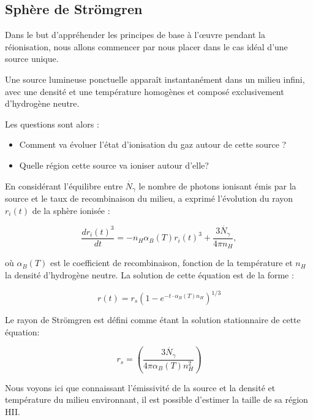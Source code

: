 \subsection{Sphère de Strömgren}
\label{sec:stromgren}

Dans le but d’appréhender les principes de base à l’œuvre pendant la réionisation, nous allons commencer par nous placer dans le cas idéal d'une source unique.

Une source lumineuse ponctuelle apparaît instantanément dans un milieu infini, avec une densité et une température homogènes et composé exclusivement d’hydrogène neutre.

Les questions sont alors : 
\begin{itemize}
\item Comment va évoluer l’état d'ionisation du gaz autour de cette source ?
\item Quelle région cette source va ioniser autour d'elle?
\end{itemize}

En considérant l'équilibre entre $\dot{N_\gamma}$ le nombre de photons ionisant émis par la source et le taux de recombinaison du milieu, \cite{stromgren_physical_1939} a exprimé l'évolution du rayon  $r_i(t)$ de la sphère ionisée :

\begin{equation}
\frac{dr_i(t)^3}{dt} = -n_H \alpha_B(T)r_i (t)^3 + \frac{3 \dot{N_\gamma} }{4 \pi n_H},
\end{equation}

où $\alpha_B(T)$ est le coefficient de recombinaison, fonction de la température et $n_H$ la densité d'hydrogène neutre.
La solution de cette équation est de la forme :

\begin{equation}
r(t) = r_s \left( 1 - e^{-t\cdot \alpha_B(T) n_H } \right)^{1/3}
\end{equation}

%

Le rayon de Strömgren est défini comme étant la solution stationnaire de cette équation:

\begin{equation}
r_s = \left( \frac{3 \dot{N_\gamma} }{4 \pi \alpha_B(T) n_H^2} \right)
\end{equation}

Nous voyons ici que connaissant l'émissivité de la source et la densité et température du milieu environnant, il est possible d'estimer la taille de sa région HII.

